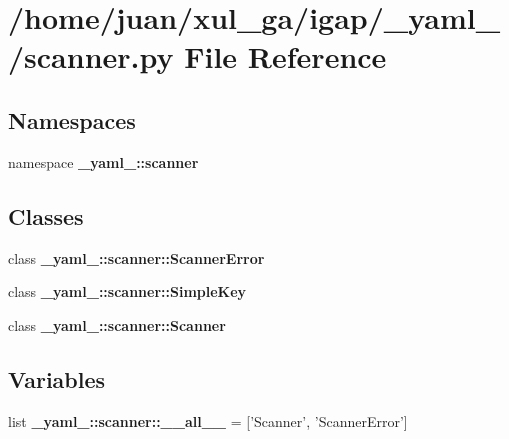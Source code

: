 \section{/home/juan/xul\_\-ga/igap/\_\-yaml\_\-/scanner.py File Reference}
\label{scanner_8py}
\subsection*{Namespaces}
\begin{CompactItemize}
\item 
namespace {\bf \_\-yaml\_\-::scanner}
\end{CompactItemize}
\subsection*{Classes}
\begin{CompactItemize}
\item 
class {\bf \_\-yaml\_\-::scanner::ScannerError}
\item 
class {\bf \_\-yaml\_\-::scanner::SimpleKey}
\item 
class {\bf \_\-yaml\_\-::scanner::Scanner}
\end{CompactItemize}
\subsection*{Variables}
\begin{CompactItemize}
\item 
list {\bf \_\-yaml\_\-::scanner::\_\-\_\-all\_\-\_\-} = ['Scanner', 'ScannerError']
\end{CompactItemize}
